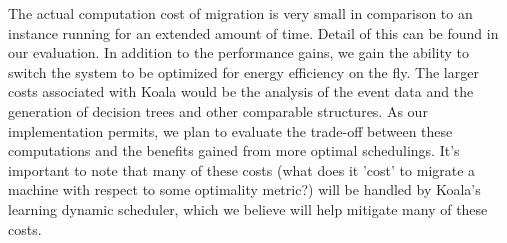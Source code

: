 The actual computation cost of migration is very small in comparison to an instance running for an extended amount of time.  Detail of this can be found in our evaluation.  In addition to the performance gains, we gain the ability to switch the system to be optimized for energy efficiency on the fly.  The larger costs associated with Koala would be the analysis of the event data and the generation of decision trees and other comparable structures.  As our implementation permits, we plan to evaluate the trade-off between these computations and the benefits gained from more optimal schedulings.  It's important to note that many of these costs (what does it 'cost' to migrate a machine with respect to some optimality metric?) will be handled by Koala's learning dynamic scheduler, which we believe will help mitigate many of these costs.
